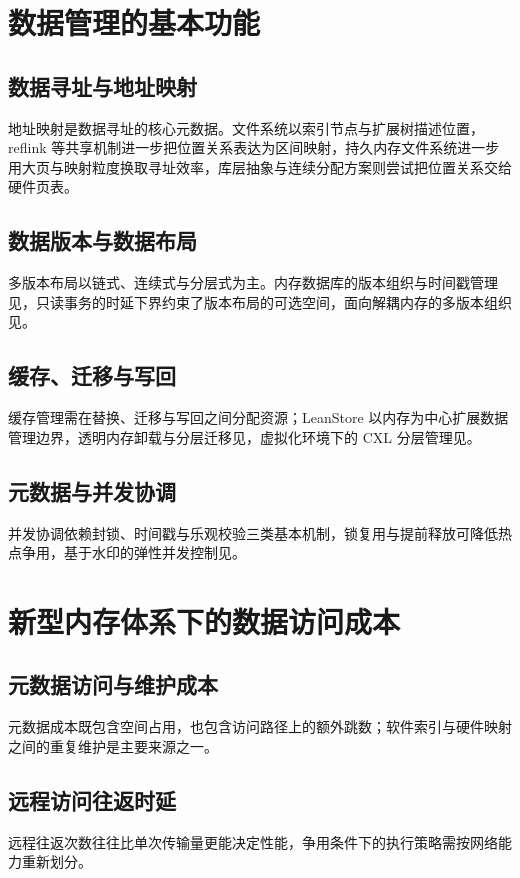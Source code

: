 \section{数据管理的基本功能}
\subsection{数据寻址与地址映射}
地址映射是数据寻址的核心元数据。文件系统以索引节点与扩展树描述位置\cite{mathurNew2007}，reflink 等共享机制进一步把位置关系表达为区间映射\cite{linuxkernelXfs}，持久内存文件系统进一步用大页与映射粒度换取寻址效率\cite{kadekodiWinefs2021}，库层抽象与连续分配方案则尝试把位置关系交给硬件页表\cite{marmolLibpm2018,liCtfs2022}。
\subsection{数据版本与数据布局}
多版本布局以链式、连续式与分层式为主。内存数据库的版本组织与时间戳管理见\cite{tuSpeedy2013,weiUnifying2021}，只读事务的时延下界约束了版本布局的可选空间\cite{luSnow2016}，面向解耦内存的多版本组织见\cite{zhangMotor2024,zhangFord2022}。
\subsection{缓存、迁移与写回}
缓存管理需在替换、迁移与写回之间分配资源\cite{stonebrakerOperating1981}；LeanStore 以内存为中心扩展数据管理边界\cite{leisLeanstore2018}，透明内存卸载与分层迁移见\cite{weinerTmo2022,xiangNomad2024}，虚拟化环境下的 CXL 分层管理见\cite{zhongManaging2024}。
\subsection{元数据与并发协调}
并发协调依赖封锁、时间戳与乐观校验三类基本机制\cite{bernsteinConcurrency1987,kungOn1981}，锁复用与提前释放可降低热点争用\cite{chakrabartiAtlas2014,guoReleasing2021}，基于水印的弹性并发控制见\cite{dingCentiman2015}。

\section{新型内存体系下的数据访问成本}
\subsection{元数据访问与维护成本}
元数据成本既包含空间占用，也包含访问路径上的额外跳数；软件索引与硬件映射之间的重复维护是主要来源之一\cite{marmolLibpm2018,liCtfs2022}。
\subsection{远程访问往返时延}
远程往返次数往往比单次传输量更能决定性能\cite{binnigEnd2016,zamanianEnd2017}，争用条件下的执行策略需按网络能力重新划分\cite{zamanianChiller2020}。
